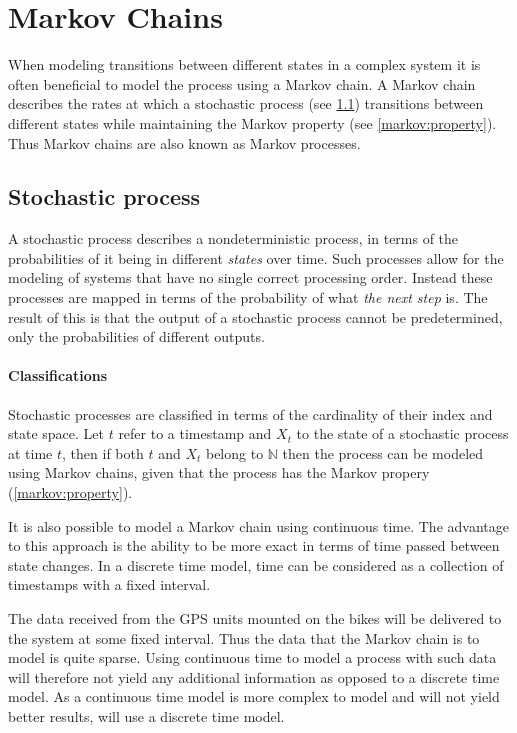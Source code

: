 \section{Markov Chains}\label{markov}
When modeling transitions between different states in a complex system it is often beneficial to model the process using a Markov chain.
A Markov chain describes the rates at which a stochastic process (see \cref{markov:stochastic}) transitions between different states while maintaining the Markov property (see \cref{markov:property}).
Thus Markov chains are also known as Markov processes.

\subsection{Stochastic process}\label{markov:stochastic}
A stochastic process describes a nondeterministic process, in terms of the probabilities of it being in different \emph{states} over time.
Such processes allow for the modeling of systems that have no single correct processing order.
Instead these processes are mapped in terms of the probability of what \emph{the next step} is.
The result of this is that the output of a stochastic process cannot be predetermined, only the probabilities of different outputs.

\paragraph{Classifications}
Stochastic processes are classified in terms of the cardinality of their index and state space.
Let $t$ refer to a timestamp and $X_t$ to the state of a stochastic process at time $t$, then if both $t$ and $X_t$ belong to $\mathbb{N}$ then the process can be modeled using Markov chains, given that the process has the Markov propery (\cref{markov:property}).

It is also possible to model a Markov chain using continuous time.
The advantage to this approach is the ability to be more exact in terms of time passed between state changes.
In a discrete time model, time can be considered as a collection of timestamps with a fixed interval.

The data received from the GPS units mounted on the bikes will be delivered to the system at some fixed interval.
Thus the data that the Markov chain is to model is quite sparse.
Using continuous time to model a process with such data will therefore not yield any additional information as opposed to a discrete time model.
As a continuous time model is more complex  to model and will not yield better results, \projectname{} will use a discrete time model.


